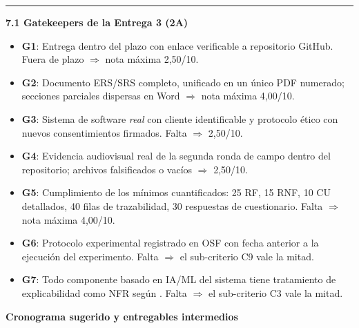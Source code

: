\documentclass[11pt,a4paper]{article}
\newcounter{secc}
\newcommand{\secband}[1]{%
    \stepcounter{secc}\par\vspace{9pt}\noindent
    {\setlength{\fboxsep}{0pt}%
        \colorbox{uteqgold}{\parbox[c][20pt][c]{0.05\textwidth}{\centering\textbf{\color{white}\small \arabic{secc}}}}%
        \colorbox{uteqgreen}{\parbox[c][20pt][c]{0.95\textwidth}{\hspace{8pt}\textbf{\color{white}\small #1}}}%
    }\par\vspace{5pt}}
\newcommand{\submark}[1]{\par\vspace{4pt}\noindent
    {\color{uteqgreen}\rule[-1pt]{3.5pt}{12pt}}\hspace{6pt}\textbf{\color{uteqgreen}#1}\par\vspace{2pt}}
\begin{document}
\submark{7.1 Gatekeepers de la Entrega 3 (2A)}
\begin{itemize}
    \item \textbf{G1}: Entrega dentro del plazo con enlace verificable a repositorio GitHub. Fuera de plazo $\Rightarrow$ nota máxima 2,50/10.
    \item \textbf{G2}: Documento ERS/SRS completo, unificado en un único PDF numerado; secciones parciales dispersas en Word $\Rightarrow$ nota máxima 4,00/10.
    \item \textbf{G3}: Sistema de software \emph{real} con cliente identificable y protocolo ético con nuevos consentimientos firmados. Falta $\Rightarrow$ 2,50/10.
    \item \textbf{G4}: Evidencia audiovisual real de la segunda ronda de campo dentro del repositorio; archivos falsificados o vacíos $\Rightarrow$ 2,50/10.
    \item \textbf{G5}: Cumplimiento de los mínimos cuantificados: 25 RF, 15 RNF, 10 CU detallados, 40 filas de trazabilidad, 30 respuestas de cuestionario. Falta $\Rightarrow$ nota máxima 4,00/10.
    \item \textbf{G6}: Protocolo experimental registrado en OSF con fecha anterior a la ejecución del experimento. Falta $\Rightarrow$ el sub-criterio C9 vale la mitad.
    \item \textbf{G7}: Todo componente basado en IA/ML del sistema tiene tratamiento de explicabilidad como NFR según \cite{chazette2020nfr,chazette2021exploring}. Falta $\Rightarrow$ el sub-criterio C3 vale la mitad.
\end{itemize}

\secband{Cronograma sugerido y entregables intermedios}
\end{document}
